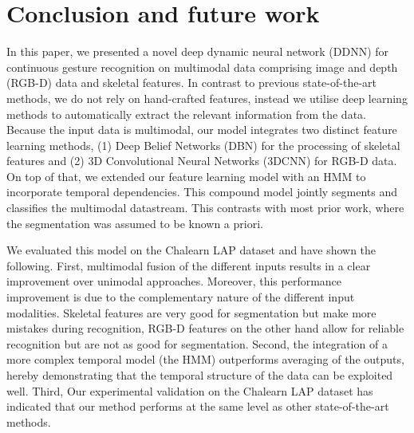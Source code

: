 
\section{Conclusion and future work}
\label{sec:conclusion}

%
In this paper, we presented a novel deep dynamic neural network (DDNN) for continuous gesture recognition on multimodal data comprising image and depth (RGB-D) data and skeletal features. %
In contrast to previous state-of-the-art methods, we do not rely on hand-crafted features, instead we utilise deep learning methods to automatically extract the relevant information from the data. 
Because the input data is multimodal, our model integrates two distinct feature learning methods, (1) Deep Belief Networks (DBN) for the processing of skeletal features and (2) 3D Convolutional Neural Networks (3DCNN) for RGB-D data. On top of that, we  extended our feature learning model with an HMM to incorporate temporal dependencies.
This compound model  jointly segments and classifies the multimodal datastream. This contrasts with most prior work, where the segmentation was assumed to be known a priori. 

We evaluated this model on the Chalearn LAP dataset and have shown the following.  First, multimodal fusion of the different inputs results in a clear improvement over unimodal approaches. Moreover, this performance improvement is due to the complementary nature of the different input modalities. Skeletal features are very good for segmentation but make more mistakes during recognition, RGB-D features on the other hand allow for reliable recognition but are not as good for segmentation.
Second, the integration of a more complex temporal model (the HMM) outperforms averaging of the outputs, hereby demonstrating that the temporal structure of the data can be exploited well. Third, 
Our experimental validation on the Chalearn LAP dataset has indicated that our method performs at the same level as other state-of-the-art methods. 

